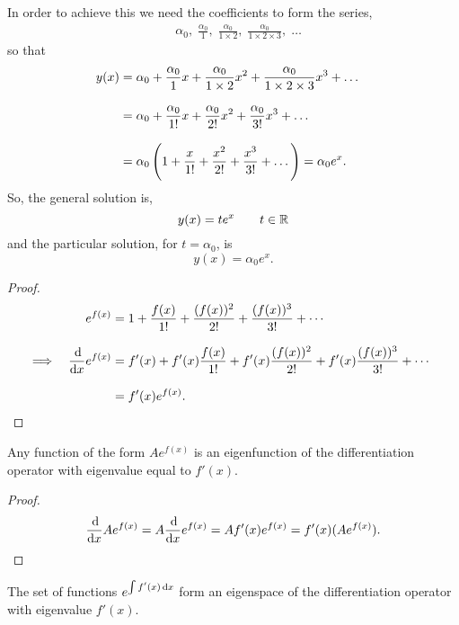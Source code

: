 \documentclass[../MathsNotesBase.tex]{subfiles}
\begin{document}
{		In order to achieve this we need the coefficients to form the series,
		\begin{align*}
		&\alpha_0,\; \frac{\alpha_0}{1},\; \frac{\alpha_0}{1 \times 2},\; \frac{\alpha_0}{1 \times 2 \times 3},\; \dots
		\end{align*}
		so that
		\begin{align*}
		y(x) &= \alpha_0 + \frac{\alpha_0}{1}x + \frac{\alpha_0}{1 \times 2}x^2 + \frac{\alpha_0}{1 \times 2 \times 3}x^3 + \dots \\[8pt]
		&= \alpha_0 + \frac{\alpha_0}{1!}x + \frac{\alpha_0}{2!}x^2 + \frac{\alpha_0}{3!}x^3 + \dots &\text{\scriptsize{}} \\[8pt]
		&= \alpha_0\left(1 + \frac{x}{1!} + \frac{x^2}{2!} + \frac{x^3}{3!} + \dots \right) = \alpha_0 e^x.
		\end{align*}
		So, the general solution is,
		\[ y(x) = t e^x \hspace{20pt} t \in \mathbb{R}^{} \]
		and the particular solution, for ${ t = \alpha_0 }$, is
		\[ y(x) = \alpha_0 e^x. \]
		
		\bigskip\bigskip
		\begin{proof}
			\begin{align*}
			&& e^{f(x)} &= 1 + \frac{f(x)}{1!} + \frac{(f(x))^2}{2!} + \frac{(f(x))^3}{3!} + \cdots \\[8pt]
			&\implies & \frac{\dif}{\dif x} e^{f(x)} &= f'(x) + f'(x)\frac{f(x)}{1!} + f'(x)\frac{(f(x))^2}{2!} + f'(x)\frac{(f(x))^3}{3!} + \cdots &\sidecomment{} \\[8pt]
			&&&= f'(x) e^{f(x)}.
			\end{align*}
		\end{proof}
		\begin{corollary}
			Any function of the form $Ae^{f(x)}$ is an eigenfunction of the differentiation operator with eigenvalue equal to $f'(x)$.
		\end{corollary}
		\begin{proof}
			\[ \frac{\dif}{\dif x} Ae^{f(x)} = A \frac{\dif}{\dif x} e^{f(x)} = A f'(x)e^{f(x)} = f'(x)(Ae^{f(x)}). \qedhere \]
		\end{proof}
		\begin{corollary}
			The set of functions $e^{\int f'(x) \dif x}$ form an eigenspace of the differentiation operator with eigenvalue $f'(x)$.
		\end{corollary}
	
}
\end{document}
